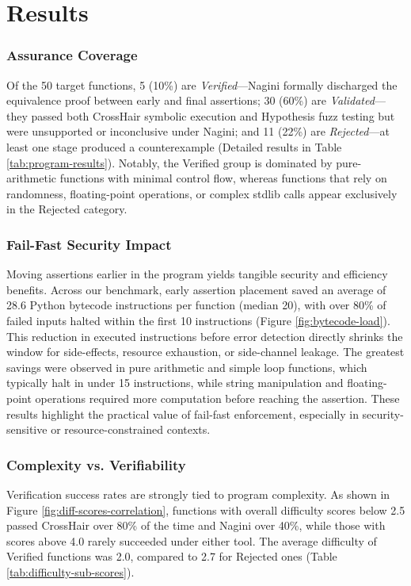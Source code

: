 \section{Results}

\subsubsection{Assurance Coverage}

Of the 50 target functions, 5 (10\%) are \emph{Verified}---Nagini formally discharged the equivalence proof between early and final assertions; 30 (60\%) are \emph{Validated}---they passed both CrossHair symbolic execution and Hypothesis fuzz testing but were unsupported or inconclusive under Nagini; and 11 (22\%) are \emph{Rejected}---at least one stage produced a counterexample (Detailed results in Table \ref{tab:program-results}). Notably, the Verified group is dominated by pure-arithmetic functions with minimal control flow, whereas functions that rely on randomness, floating-point operations, or complex stdlib calls appear exclusively in the Rejected category.


\subsubsection{Fail-Fast Security Impact}

Moving assertions earlier in the program yields tangible security and efficiency benefits. Across our benchmark, early assertion placement saved an average of 28.6 Python bytecode instructions per function (median 20), with over 80\% of failed inputs halted within the first 10 instructions (Figure \ref{fig:bytecode-load}). This reduction in executed instructions before error detection directly shrinks the window for side-effects, resource exhaustion, or side-channel leakage. The greatest savings were observed in pure arithmetic and simple loop functions, which typically halt in under 15 instructions, while string manipulation and floating-point operations required more computation before reaching the assertion. These results highlight the practical value of fail-fast enforcement, especially in security-sensitive or resource-constrained contexts.

\subsubsection{Complexity vs. Verifiability}

Verification success rates are strongly tied to program complexity. As shown in Figure \ref{fig:diff-scores-correlation}, functions with overall difficulty scores below 2.5 passed CrossHair over 80\% of the time and Nagini over 40\%, while those with scores above 4.0 rarely succeeded under either tool. The average difficulty of Verified functions was 2.0, compared to 2.7 for Rejected ones (Table \ref{tab:difficulty-sub-scores}).

